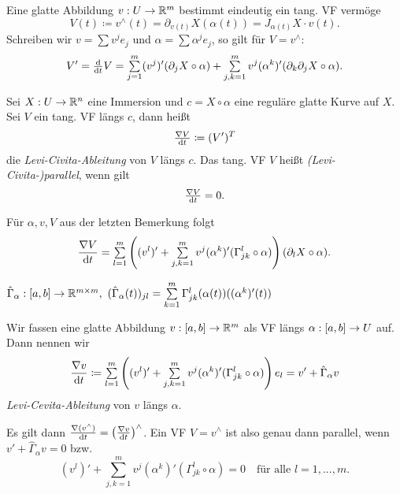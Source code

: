 \documentclass{cheat-sheet}
\begin{document}

\begin{bem}
  Eine glatte Abbildung $v : U \to \mathbb{R}^m$ bestimmt eindeutig ein tang. VF vermöge
  \[ V(t) \coloneqq v^\wedge(t) = \partial_{v(t)} X(\alpha(t)) = J_{\alpha(t)} X \cdot v(t). \]
  Schreiben wir $v = \sum v^j e_j$ und $\alpha = \sum \alpha^j e_j$, so gilt für $V = v^\wedge$:
  \[ V' = \tfrac{\d}{\d t} V = \sum_{j=1}^m (v^j)' (\partial_j X \circ \alpha) + \sum_{j,k=1}^m v^j (\alpha^k)' (\partial_k \partial_j X \circ \alpha). \]
\end{bem}


\begin{defn}
  Sei $X : U \to \mathbb{R}^n$ eine Immersion und $c = X \circ \alpha$ eine reguläre glatte Kurve auf $X$. Sei $V$ ein tang. VF längs $c$, dann heißt
  \[ \tfrac{\nabla V}{\mathrm{d} t} \coloneqq (V')^T \]
  die \emph{Levi-Civita-Ableitung} von $V$ längs $c$. Das tang. VF $V$ heißt \emph{(Levi-Civita-)parallel}, wenn gilt
  \[ \tfrac{\nabla V}{\mathrm{d} t} = 0. \]
\end{defn}

\begin{bem}
  Für $\alpha, v, V$ aus der letzten Bemerkung folgt
  \[ \frac{\nabla V}{\d t} = \sum_{l=1}^m \left( (v^l)' + \sum_{j,k=1}^m v^j (\alpha^k)' (\Gamma_{jk}^l \circ \alpha) \right) (\partial_l X \circ \alpha). \]
\end{bem}

\begin{nota}
  $\hat{\Gamma}_{\alpha} : \cinterval{a}{b} \to \R^{m \times m}, \,\, (\hat{\Gamma}_{\alpha}(t))_{jl} = \sum_{k=1}^m \Gamma_{jk}^l (\alpha(t))((\alpha^k)'(t))$
\end{nota}

\begin{defn}
  Wir fassen eine glatte Abbildung $v : \left[ a, b \right] \to \mathbb{R}^m$ als VF längs $\alpha : \left[ a, b \right] \to U$ auf. Dann nennen wir
  \[ \frac{\nabla v}{\d t} \coloneqq \sum_{l=1}^m \left( (v^l)' + \sum_{j,k=1}^m v^j (\alpha^k)' (\Gamma_{jk}^l \circ \alpha) \right) e_l = v' + \hat{\Gamma}_{\alpha} v \]
  \emph{Levi-Cevita-Ableitung} von $v$ längs $\alpha$.
\end{defn}

\begin{satz}
  Es gilt dann $\tfrac{\nabla (v^\wedge)}{\mathrm{d} t} = \left( \tfrac{\nabla v}{\mathrm{d} t} \right)^\wedge$. Ein VF $V = v^\wedge$ ist also genau dann parallel, wenn $v' + \hat{\Gamma}_\alpha v = 0$ bzw.
  \[ (v^l)' + \sum_{j,k=1}^m v^j (\alpha^k)' (\Gamma_{jk}^l \circ \alpha) = 0 \quad \text{für alle $l = 1, ..., m$.} \]
\end{satz}
\end{document}
